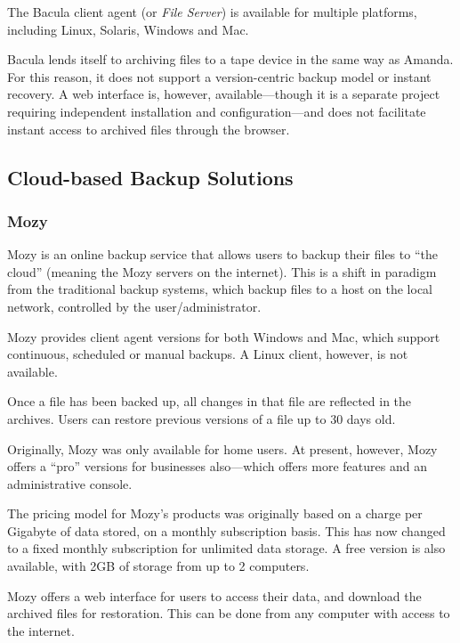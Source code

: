 The Bacula client agent (or \emph{File Server}) is available for multiple platforms,
including Linux, Solaris, Windows and Mac\cite{Bacula-features}.

Bacula lends itself to archiving files to a tape device in the same way as
Amanda.  For this reason, it does not support a version-centric backup model or
instant recovery. A web interface is, however, available---though it is
a separate project requiring independent installation and configuration---and
does not facilitate instant access to archived files through the
browser\cite{Bacula-about}.

\subsection{Cloud-based Backup Solutions}

\subsubsection{Mozy}

Mozy is an online backup service that allows users to backup their files to
``the cloud'' (meaning the Mozy servers on the internet)\cite{Mozy}. This is
a shift in paradigm from the traditional backup systems, which backup files to
a host on the local network, controlled by the user/administrator. 

Mozy provides client agent versions for both Windows and Mac, which support
continuous, scheduled or manual backups. A Linux client, however, is not
available\cite{Mozy}.

Once a file has been backed up, all changes in that file are reflected in the
archives. Users can restore previous versions of a file up to 30 days
old\cite{Mozy}.

Originally, Mozy was only available for home users. At present, however, Mozy
offers a ``pro'' versions for businesses also---which offers more features and
an administrative console\cite{Mozy-crunchbase}.

The pricing model for Mozy's products was originally based on a charge per
Gigabyte of data stored, on a monthly subscription
basis\cite{Carbonite-report}. This has now changed to a fixed monthly
subscription for unlimited data storage. A free version is also available, with
2GB of storage from up to 2 computers\cite{Mozy}.

Mozy offers a web interface for users to access their data, and download the
archived files for restoration. This can be done from any computer with access
to the internet\cite{Mozy}.

